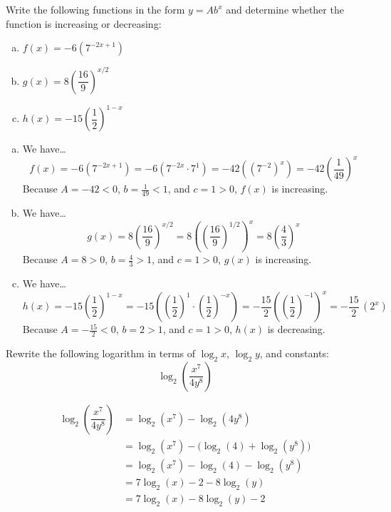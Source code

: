 \documentclass[11pt,letterpaper]{article}
\begin{document}

 Write the following functions in the form $y= Ab^x$ and determine whether the function is increasing or decreasing:
	\begin{enumerate}[(a)]
	\item $f(x)= -6(7^{-2x + 1})$
	\item $g(x)= 8 \left( \dfrac{16}{9} \right)^{x/2}$
	\item $h(x)= -15 \left( \dfrac{1}{2} \right)^{1 - x}$
	\end{enumerate} \pspace

\sol
\begin{enumerate}[(a)]
\item We have\dots
	\[
	f(x)= -6(7^{-2x + 1})= -6( 7^{-2x} \cdot 7^1)= -42 ( (7^{-2})^x)= -42 \left( \dfrac{1}{49} \right)^x
	\]
Because $A= -42 < 0$, $b= \frac{1}{49} < 1$, and $c= 1 > 0$, $f(x)$ is increasing. \pspace
 
\item We have\dots
	\[
	g(x)= 8 \left( \dfrac{16}{9} \right)^{x/2}= 8 \left( \left( \dfrac{16}{9} \right)^{1/2} \right)^x= 8 \left( \dfrac{4}{3} \right)^x
	\]
Because $A= 8 > 0$, $b= \frac{4}{3} > 1$, and $c= 1 > 0$, $g(x)$ is increasing. \pspace

\item We have\dots
	\[
	h(x)= -15 \left( \dfrac{1}{2} \right)^{1 - x}= -15 \left( \left( \dfrac{1}{2} \right)^1 \cdot \left( \dfrac{1}{2} \right)^{-x} \right)= -\dfrac{15}{2} \left( \left( \dfrac{1}{2} \right)^{-1} \right)^x= -\dfrac{15}{2} \, (2^x)
	\]
Because $A= -\frac{15}{2} < 0$, $b= 2 > 1$, and $c= 1 > 0$, $h(x)$ is decreasing. 
\end{enumerate}



\newpage



 Rewrite the following logarithm in terms of $\log_2 x$, $\log_2 y$, and constants:
	\[
	\log_2 \left( \dfrac{x^7}{4y^8} \right)
	\] \pspace

\sol
	\[
	\begin{aligned}
	\log_2 \left( \dfrac{x^7}{4y^8} \right)&= \log_2(x^7) - \log_2(4y^8) \\[0.3cm]
	&= \log_2(x^7) - \big( \log_2(4) + \log_2(y^8) \big) \\[0.3cm]
	&= \log_2(x^7) - \log_2(4) - \log_2(y^8) \\[0.3cm]
	&= 7\log_2(x) - 2 - 8\log_2(y) \\[0.3cm]
	&= 7\log_2(x) - 8\log_2(y) - 2
	\end{aligned}
	\]
\end{document}
